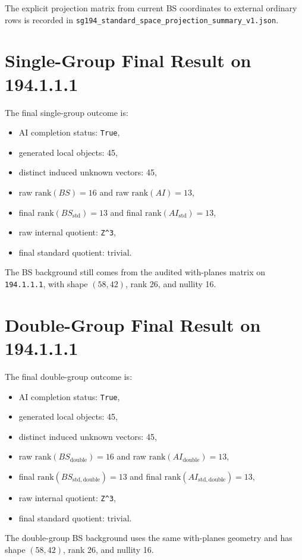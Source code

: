 \documentclass[11pt]{article}
\begin{document}
The explicit projection matrix from current BS coordinates to external ordinary rows is recorded in \texttt{sg194\_standard\_space\_projection\_summary\_v1.json}.

\section{Single-Group Final Result on 194.1.1.1}
The final single-group outcome is:
\begin{itemize}
\item AI completion status: \texttt{True},
\item generated local objects: 45,
\item distinct induced unknown vectors: 45,
\item raw $\mathrm{rank}(BS) = 16$ and raw $\mathrm{rank}(AI) = 13$,
\item final $\mathrm{rank}(BS_{\mathrm{std}}) = 13$ and final $\mathrm{rank}(AI_{\mathrm{std}}) = 13$,
\item raw internal quotient: \texttt{Z\textasciicircum{}3},
\item final standard quotient: $\mathrm{trivial}$.
\end{itemize}
The BS background still comes from the audited with-planes matrix on \texttt{194.1.1.1}, with shape $(58,42)$, rank 26, and nullity 16.

\section{Double-Group Final Result on 194.1.1.1}
The final double-group outcome is:
\begin{itemize}
\item AI completion status: \texttt{True},
\item generated local objects: 45,
\item distinct induced unknown vectors: 45,
\item raw $\mathrm{rank}(BS_{\mathrm{double}}) = 16$ and raw $\mathrm{rank}(AI_{\mathrm{double}}) = 13$,
\item final $\mathrm{rank}(BS_{\mathrm{std,double}}) = 13$ and final $\mathrm{rank}(AI_{\mathrm{std,double}}) = 13$,
\item raw internal quotient: \texttt{Z\textasciicircum{}3},
\item final standard quotient: $\mathrm{trivial}$.
\end{itemize}
The double-group BS background uses the same with-planes geometry and has shape $(58,42)$, rank 26, and nullity 16.
\end{document}
